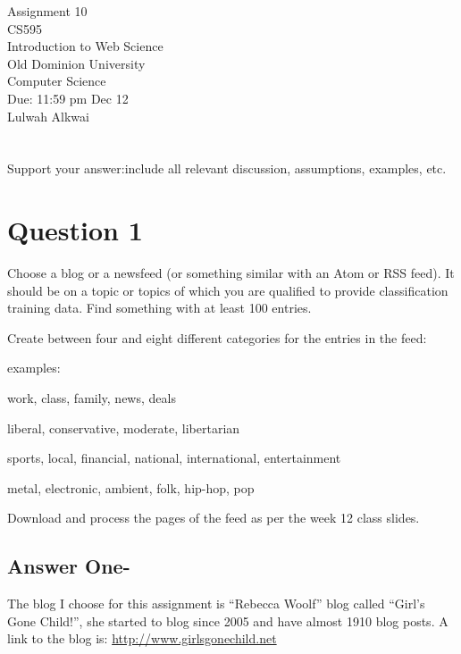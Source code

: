 \documentclass[letterpaper,11pt]{article}
\begin{document}
\begin{titlepage}
\begin{center}
\Huge{Assignment 10}
\\
\Large{CS595}
\\
\Large{Introduction to Web Science}
\\
\Large{Old Dominion University}
\\
\Large{Computer Science}
\\
\Large{Due: 11:59 pm Dec 12}
\\
\Large{Lulwah Alkwai}
\\
\end{center}
\end{titlepage}
\newpage

\section*{}

Support your answer:include all relevant discussion, assumptions, examples, etc.

\section*{Question 1}

Choose a blog or a newsfeed (or something similar with an Atom or RSS feed).  It should be on a topic or topics of which you are  qualified to provide classification training data.  Find something with at least 100 entries.  

Create between four and eight different categories for the entries in the feed:

examples: 

work, class, family, news, deals

liberal, conservative, moderate, libertarian

sports, local, financial, national, international, entertainment

metal, electronic, ambient, folk, hip-hop, pop

Download and process the pages of the feed as per the week 12 class slides.
\newpage
\subsection*{Answer One-}
The blog I choose for this assignment is ``Rebecca Woolf'' blog called ``Girl's Gone Child!'', she started to blog since 2005 and have almost 1910 blog posts. A link to the blog is:
\url{http://www.girlsgonechild.net}
\end{document}
